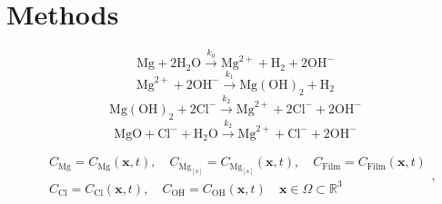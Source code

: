 \section{Methods}

\begin{equation} \label{eq:kinetics_oxidation_react1}
\mathrm{Mg}+2 \mathrm{H}_{2} \mathrm{O} \stackrel{k_{0}}{\rightarrow} \mathrm{Mg}^{2+}+\mathrm{H}_{2}+2 \mathrm{OH}^{-} 
\end{equation}
\begin{equation} \label{eq:kinetics_oxidation_react2}
\mathrm{Mg}^{2+}+2 \mathrm{OH}^{-} \stackrel{k_{1}}{\rightarrow} \mathrm{Mg}(\mathrm{OH})_{2}+\mathrm{H}_{2}
\end{equation}
\begin{equation} \label{eq:kinetics_break_react}
\mathrm{Mg}(\mathrm{OH})_{2}+2 \mathrm{Cl}^{-} \stackrel{k_{2}}{\rightarrow} \mathrm{Mg}^{2+}+2 \mathrm{Cl}^{-}+2 \mathrm{OH}^{-}
\end{equation}
\begin{equation} \label{eq:kinetics_break_react_mgo}
\mathrm{MgO}+ \mathrm{Cl}^{-} + \mathrm{H}_{2} \mathrm{O} \stackrel{k_{2}}{\rightarrow} \mathrm{Mg}^{2+}+ \mathrm{Cl}^{-}+ 2\mathrm{OH}^{-}
\end{equation}

\begin{equation} \label{eq:kinetics_state_vars}
\begin{aligned}
&C_{\mathrm{Mg}} = C_{\mathrm{Mg}}(\mathbf{x},t), \quad C_{\mathrm{Mg}_\mathrm{[s]}} = C_{\mathrm{Mg}_\mathrm{[s]}}(\mathbf{x},t), \quad C_{\mathrm{Film}} = C_{\mathrm{Film}}(\mathbf{x},t)  \\
&C_{\mathrm{Cl}} = C_{\mathrm{Cl}}(\mathbf{x},t), \quad C_{\mathrm{OH}} = C_{\mathrm{OH}}(\mathbf{x},t) \quad \mathbf{x} \in \Omega \subset \mathbb{R}^{3}
\end{aligned},
\end{equation}



